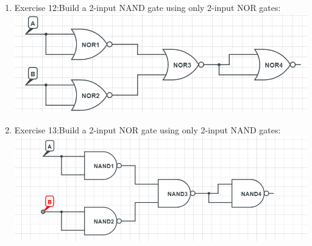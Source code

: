 \documentclass[12pt]{article}
\begin{document}
\begin{enumerate}
\begin{itemize}
	\end{itemize}
	\item Exercise 12:Build a 2-input NAND gate using only 2-input NOR gates:\\
	\includegraphics[scale = 0.75]{Bai12a.png}
	\item Exercise 13:Build a 2-input NOR gate using only 2-input NAND gates:\\
	\includegraphics[scale = 0.75]{Bai13.png}
\end{enumerate}
\end{document}
